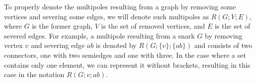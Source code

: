 To properly denote the multipoles resulting from a graph by removing some vertices and severing some edges, we will denote such multipoles as $R(G;V;E)$, where $G$ is the former graph, $V$ is the set of removed vertices, and $E$ is the set of severed edges. For example, a multipole resulting from a snark $G$ by removing vertex $v$ and severing edge $ab$ is denoted by $R(G;\{v\}; \{ab\})$ and consists of two connectors, one with two semiedges and one with three. In the case where a set contains only one element, we can represent it without brackets, resulting in this case in the notation $R(G;v; ab)$.